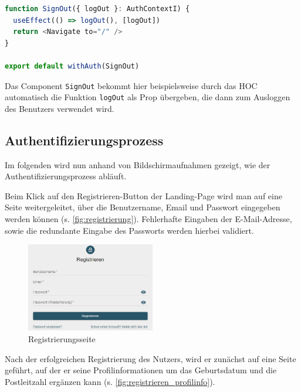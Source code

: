 \begin{lstlisting}[language=JavaScript, caption=Verwendung des Authentifizierungscontext-HOCs, label={lst:authcontext_impl}]
function SignOut({ logOut }: AuthContextI) {
  useEffect(() => logOut(), [logOut])
  return <Navigate to="/" />
}

export default withAuth(SignOut)  
\end{lstlisting}

Das Component \texttt{SignOut} bekommt hier beispielsweise durch das HOC automatisch die Funktion \texttt{logOut} als Prop übergeben, die dann zum Ausloggen des Benutzers verwendet wird.

\subsection{Authentifizierungsprozess}
\label{sec:authentifizierungsprozess}

Im folgenden wird nun anhand von Bildschirmaufnahmen gezeigt, wie der Authentifizierungsprozess abläuft.

Beim Klick auf den Registrieren-Button der Landing-Page wird man auf eine Seite weitergeleitet, über die Benutzername, Email und Passwort eingegeben werden können (s. \autoref{fig:registrierung}). Fehlerhafte Eingaben der E-Mail-Adresse, sowie die redundante Eingabe des Passworts werden hierbei validiert.

\begin{figure}[!htb]
  \centering
  \includegraphics[width=0.5\textwidth]{figures/boas/21_registrieren.png}
  \caption[]{Registrierungsseite}
  \label{fig:registrierung}
\end{figure}

Nach der erfolgreichen Registrierung des Nutzers, wird er zunächst auf eine Seite geführt, auf der er seine Profilinformationen um das Geburtsdatum und die Postleitzahl ergänzen kann (s. \autoref{fig:registrieren_profilinfo}).

